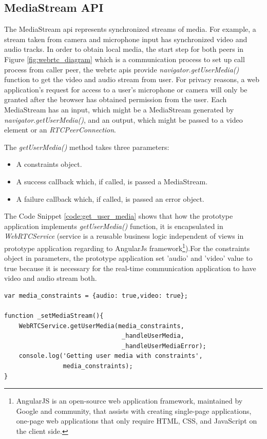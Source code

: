 \subsection{MediaStream API}

\par The MediaStream \gls{api} represents synchronized streams of media. For example, a stream taken from camera and microphone input has synchronized video and audio tracks. In order to obtain local media, the start step for both peers in Figure \ref{fig:webrtc_diagram} which is a communication process to set up call process from caller peer, the \gls{webrtc} \gls{api}s provide \textit{navigator.getUserMedia()} function to get the video and audio stream from user. For privacy reasons, a web application’s request for access to a user’s microphone or camera will only be granted after the browser has obtained permission from the user. Each MediaStream has an input, which might be a MediaStream generated by \textit{navigator.getUserMedia()}, and an output, which might be passed to a video element or an \textit{RTCPeerConnection}.
\par The \textit{getUserMedia()} method takes three parameters:

\begin{itemize}[topsep=-1em,parsep=0em,itemsep=0em]
 \item A constraints object.
 \item A success callback which, if called, is passed a MediaStream.
 \item A failure callback which, if called, is passed an error object.
\end{itemize}

\par The Code Snippet \ref{code:get_user_media} shows that how the prototype application implements \textit{getUserMedia()} function, it is encapsulated in \textit{WebRTCService} (service is a reusable business logic independent of views in prototype application regarding to AngularJs framework\footnote{AngularJS is an open-source web application framework, maintained by Google and community, that assists with creating single-page applications, one-page web applications that only require HTML, CSS, and JavaScript on the client side.\cite{wiki:angularjs}}).For the constraints object in parameters, the prototype application set 'audio' and 'video' value to true because it is necessary for the real-time communication application to have video and audio stream both.

\begin{lstlisting}[caption={Get User Media Stream function},label={code:get_user_media}]
var media_constraints = {audio: true,video: true};

function _setMediaStream(){
	WebRTCService.getUserMedia(media_constraints,
  								_handleUserMedia,
  								_handleUserMediaError);
  	console.log('Getting user media with constraints', 
  				media_constraints);
}
\end{lstlisting}

